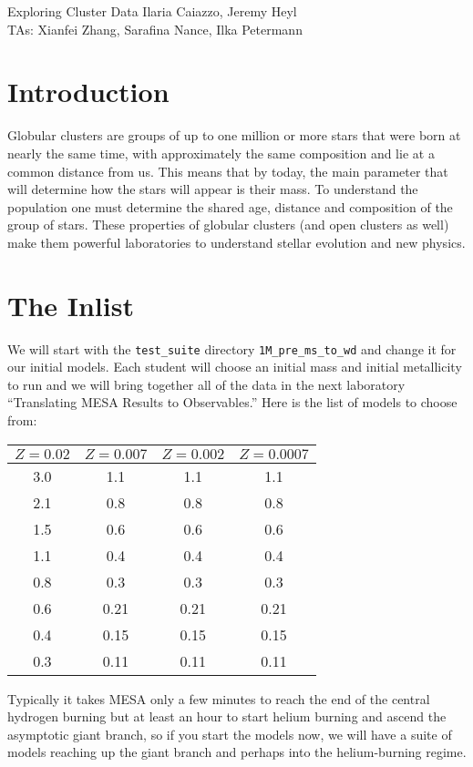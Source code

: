 \documentclass{article}
\begin{document}
\begin{titlebox}{Exploring Cluster Data}
Ilaria Caiazzo, Jeremy Heyl \\
TAs: Xianfei Zhang, Sarafina Nance, Ilka Petermann
\end{titlebox}

\section{Introduction}

Globular clusters are groups of up to one million or more stars that were born at nearly the same time, with approximately the same composition and lie at a common distance from us.  This means that by today, the main parameter that will determine how the stars will appear is their mass. To understand the population one must determine the shared age, distance and composition of the group of stars. These properties of globular clusters (and open clusters as well) make them powerful laboratories to understand stellar evolution and new physics.

\section{The Inlist}

We will start with the \texttt{test\_suite} directory \texttt{1M\_pre\_ms\_to\_wd} and change it for our initial models.  Each student will choose an initial mass and initial metallicity to run and we will bring together all of the data in the next laboratory ``Translating MESA Results to Observables.'' Here is the list of models to choose from:

\begin{center}
\begin{tabular}{c|ccc}
\hline
$Z=0.02$ &
$Z=0.007$ &
$Z=0.002$ & 
$Z=0.0007$ 
\\  \hline 
3.0 & 1.1 & 1.1 & 1.1  \\
2.1 & 0.8 & 0.8 & 0.8  \\
1.5 & 0.6 & 0.6 & 0.6 \\
1.1 & 0.4 & 0.4 & 0.4  \\
0.8 & 0.3 & 0.3 & 0.3  \\
0.6 & 0.21 & 0.21 & 0.21 \\
0.4 & 0.15 & 0.15 & 0.15 \\
0.3 & 0.11 & 0.11 & 0.11 
\end{tabular}
\end{center}

Typically it takes MESA only a few minutes to reach the end of the central hydrogen burning but at least an hour to start helium burning and ascend the asymptotic giant branch, so if you start the models now, we will have a suite of models reaching up the giant branch and perhaps into the helium-burning regime.
\end{document}

